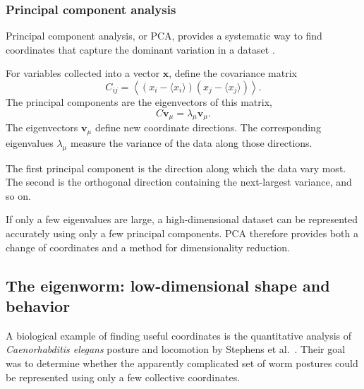 \subsubsection{Principal component analysis}
\label{sec:pca}


Principal component analysis, or PCA, provides a systematic way to find coordinates that capture the dominant variation in a dataset \cite{pearson1901liii,hotelling1933analysis}.

For variables collected into a vector $\mathbf{x}$, define the covariance matrix
\[
    C_{ij}=\left\langle\left(x_i-\langle x_i\rangle\right)\left(x_j-\langle x_j\rangle\right)\right\rangle.
\]
The principal components are the eigenvectors of this matrix,
\[
    C\mathbf{v}_{\mu}=\lambda_{\mu}\mathbf{v}_{\mu}.
\]
The eigenvectors $\mathbf{v}_{\mu}$ define new coordinate directions.
The corresponding eigenvalues $\lambda_{\mu}$ measure the variance of the data along those directions.

The first principal component is the direction along which the data vary most.
The second is the orthogonal direction containing the next-largest variance, and so on.

If only a few eigenvalues are large, a high-dimensional dataset can be represented accurately using only a few principal components.
PCA therefore provides both a change of coordinates and a method for dimensionality reduction.



\subsection{The eigenworm: low-dimensional shape and behavior}
\label{sec:eigenworm}



A biological example of finding useful coordinates is the quantitative analysis of \textit{Caenorhabditis elegans} posture and locomotion by Stephens et al.\ \cite{stephens2008dimensionality}.
Their goal was to determine whether the apparently complicated set of worm postures could be represented using only a few collective coordinates.

